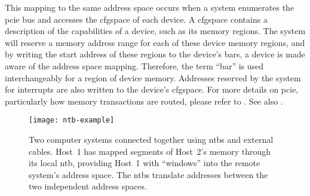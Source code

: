 This mapping to the same address space occurs when a system enumerates the \gls{pcie} bus and accesses the \gls{cfgspace} of each device.
%
A \gls{cfgspace} contains a description of the capabilities of a device, such as its memory regions.
%
The system will reserve a memory address range for each of these device memory regions, and by writing the start address of these regions to the device's \glspl{bar}, a device is made aware of the address space mapping.
%
Therefore, the term ``\gls{bar}'' is used interchangeably for a region of device memory.
%
Addresses reserved by the system for interrupts are also written to the device's \gls{cfgspace}.
%
For more details on \gls{pcie}, particularly how memory transactions are routed, please refer to . See also .



\begin{figure}
    \centering
    \texttt{[image: ntb-example]}
    \caption[Two computer systems connected using , and the  translate between the two different address domains]
    {Two computer systems connected together using \glspl{ntb} and external cables. Host~1 has mapped segments of Host~2's memory through its local \gls{ntb}, providing Host~1 with ``windows'' into the remote system's address space. The \glspl{ntb} translate addresses between the two independent address spaces.}
    \label{fig:ntb-example}
\end{figure}



